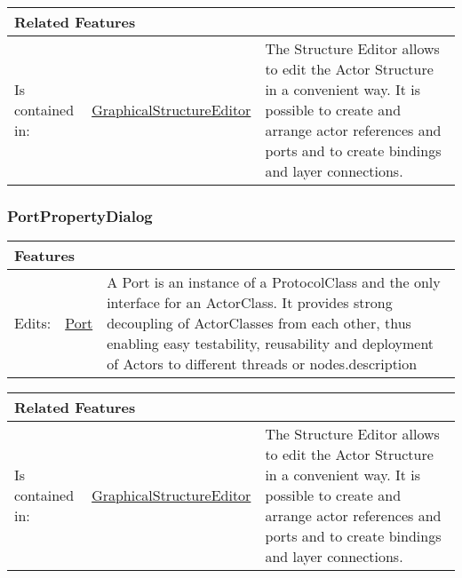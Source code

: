 			\vspace{\baselineskip}
			\begingroup
			\renewcommand{\arraystretch}{1.8} %
			\parbox{\textwidth}{
			\begin{longtable}{l l p{}}
				\multicolumn{2}{l}{\textbf{\large Related Features}} & \\
				\hline
			Is contained in: & \tabitem \hyperlink{ref:GraphicalStructureEditor}{GraphicalStructureEditor}  & The Structure Editor allows to edit the Actor Structure in a convenient way. It is possible to create and arrange actor references and ports and to create bindings and layer connections.\\
			\hline
			\end{longtable}	
			}
			\endgroup
			\vspace{\baselineskip}
			
			
		
		\subsubsection{PortPropertyDialog}
			\hypertarget{ref:PortPropertyDialog}{}
			
			
			
			\vspace{\baselineskip}
			\begingroup
			\renewcommand{\arraystretch}{1.8} %
			\parbox{\textwidth}{
			\begin{longtable}{l l p{}}
				\multicolumn{2}{l}{\textbf{\large Features}} & \\
				\hline
			Edits: & \tabitem \hyperlink{ref:Port}{Port}  & A Port is an instance of a ProtocolClass and the only interface for an ActorClass. It provides strong decoupling of ActorClasses from each other, thus enabling easy testability, reusability and deployment of Actors to different threads or nodes.description \\
			\hline
			\end{longtable}	
			}
			\endgroup
			\vspace{\baselineskip}
			
			\vspace{\baselineskip}
			\begingroup
			\renewcommand{\arraystretch}{1.8} %
			\parbox{\textwidth}{
			\begin{longtable}{l l p{}}
				\multicolumn{2}{l}{\textbf{\large Related Features}} & \\
				\hline
			Is contained in: & \tabitem \hyperlink{ref:GraphicalStructureEditor}{GraphicalStructureEditor}  & The Structure Editor allows to edit the Actor Structure in a convenient way. It is possible to create and arrange actor references and ports and to create bindings and layer connections.\\
			\hline
			\end{longtable}	
			}
			\endgroup
			\vspace{\baselineskip}
			
